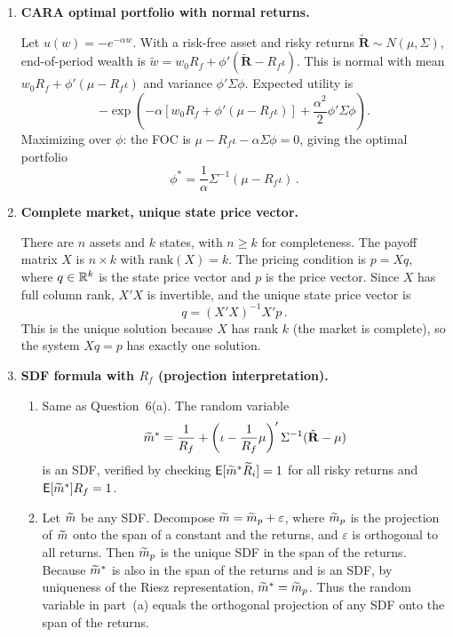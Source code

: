 \begin{enumerate}
\item \textbf{CARA optimal portfolio with normal returns.}

Let $u(w) = -e^{-\alpha w}$.  With a risk-free asset and risky returns $\tilde{\mathbf{R}} \sim N(\mu,\Sigma)$, end-of-period wealth is $\tilde{w} = w_0 R_f + \phi'(\tilde{\mathbf{R}}-R_f\iota)$.  This is normal with mean $w_0 R_f + \phi'(\mu-R_f\iota)$ and variance $\phi'\Sigma\phi$.  Expected utility is
\[
-\exp\!\left(-\alpha\left[w_0 R_f + \phi'(\mu-R_f\iota)\right] + \frac{\alpha^2}{2}\phi'\Sigma\phi\right).
\]
Maximizing over $\phi$: the FOC is $\mu - R_f\iota - \alpha\Sigma\phi = 0$, giving the optimal portfolio
\[
\phi^* = \frac{1}{\alpha}\Sigma^{-1}(\mu - R_f\iota)\,.
\]

\item \textbf{Complete market, unique state price vector.}

There are $n$ assets and $k$ states, with $n \ge k$ for completeness.  The payoff matrix $X$ is $n\times k$ with $\mathrm{rank}(X) = k$.  The pricing condition is $p = Xq$, where $q \in \mathbb{R}^k$ is the state price vector and $p$ is the price vector.  Since $X$ has full column rank, $X'X$ is invertible, and the unique state price vector is
\[
q = (X'X)^{-1}X'p\,.
\]
This is the unique solution because $X$ has rank $k$ (the market is complete), so the system $Xq = p$ has exactly one solution.

\item \textbf{SDF formula with $R_f$ (projection interpretation).}

\begin{enumerate}
\item[(a)] Same as Question~6(a).  The random variable
\[
\widetilde{m}^* = \frac{1}{R_f} + \left(\iota - \frac{1}{R_f}\mu\right)'\Sigma^{-1}(\tilde{\mathbf{R}}-\mu)
\]
is an SDF, verified by checking $\mathsf{E}[\widetilde{m}^*\widetilde{R}_i]=1$ for all risky returns and $\mathsf{E}[\widetilde{m}^*]R_f=1$.

\item[(b)] Let $\widetilde{m}$ be any SDF.  Decompose $\widetilde{m} = \widetilde{m}_p + \varepsilon$, where $\widetilde{m}_p$ is the projection of $\widetilde{m}$ onto the span of a constant and the returns, and $\varepsilon$ is orthogonal to all returns.  Then $\widetilde{m}_p$ is the unique SDF in the span of the returns.  Because $\widetilde{m}^*$ is also in the span of the returns and is an SDF, by uniqueness of the Riesz representation, $\widetilde{m}^* = \widetilde{m}_p$.  Thus the random variable in part~(a) equals the orthogonal projection of any SDF onto the span of the returns.
\end{enumerate}


\end{enumerate}
